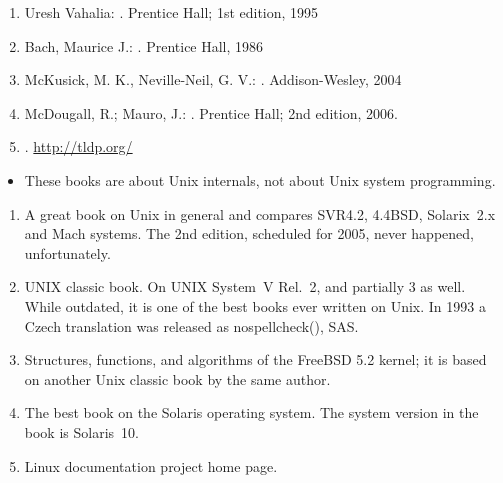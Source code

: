 
\begin{slide}

\begin{enumerate}
\item Uresh Vahalia: .
 Prentice Hall; 1st edition, 1995
\item Bach, Maurice J.: .
Prentice Hall, 1986
\item McKusick, M. K., Neville-Neil, G. V.: . Addison-Wesley, 2004
\item McDougall, R.; Mauro, J.: . Prentice Hall; 2nd
edition, 2006.
\item {}. \url{http://tldp.org/}
\end{enumerate}
\end{slide}

\begin{itemize}
\item These books are about Unix internals, not about Unix system programming.
\end{itemize}

\begin{enumerate}
\item A great book on Unix in general and compares SVR4.2, 4.4BSD, Solarix~2.x
and Mach systems.  The 2nd edition, scheduled for 2005, never happened,
unfortunately.
\item UNIX classic book. On UNIX System~V Rel.~2, and partially 3 as well.
While outdated, it is one of the best books ever written on Unix.  In 1993 a
Czech translation was released as
nospellcheck(), SAS.
\item Structures, functions, and algorithms of the FreeBSD 5.2 kernel; it is
based on another Unix classic book  by the same author.
\item The best book on the Solaris operating system.  The system version in the
book is Solaris~10.
\item Linux documentation project home page.
\end{enumerate}

